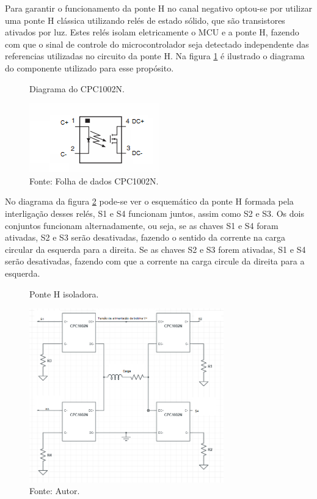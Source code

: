 Para garantir o funcionamento da ponte H no canal negativo optou-se por utilizar uma ponte H clássica \cite{ponteH} utilizando relés de estado sólido, que são transistores ativados por luz. Estes relés isolam eletricamente o MCU e a ponte H, fazendo com que o sinal de controle do microcontrolador seja detectado independente das referencias utilizadas no circuito da ponte H. Na figura \ref{fig:pontHOpt} é ilustrado o diagrama do componente utilizado para esse propósito.

\begin{figure}[H]
    \centering
     \caption{Diagrama do CPC1002N.}
     \includegraphics[width=0.5\textwidth]{./img/imagensExplicacoes/ponteHOpt.png}
     \caption*{Fonte: Folha de dados CPC1002N.}
     \label{fig:pontHOpt}
\end{figure}

No diagrama da figura \ref{fig:pontH} pode-se ver o esquemático da ponte H formada pela interligação desses relés, S1 e S4 funcionam juntos, assim como S2 e S3. Os dois conjuntos funcionam alternadamente, ou seja, se as chaves S1 e S4 foram ativadas, S2 e S3 serão desativadas, fazendo o sentido da corrente na carga circular da esquerda para a direita. Se as chaves S2 e S3 forem ativadas, S1 e S4 serão desativadas, fazendo com que a corrente na carga circule da direita para a esquerda.

\begin{figure}[H]
    \centering
     \caption{Ponte H isoladora.}
     \includegraphics[width=0.75\textwidth]{./img/imagensExplicacoes/ponte_h_rele.png}
     \caption*{Fonte: Autor.}
     \label{fig:pontH}
\end{figure}

